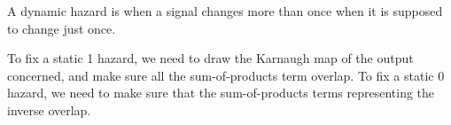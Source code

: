 \documentclass{article}
\begin{document}
\begin{definition}
    A dynamic hazard is when a signal changes more than once when it is supposed to change just once.
\end{definition}

To fix a static 1 hazard, we need to draw the Karnaugh map of the output concerned, and make sure all the sum-of-products term overlap. To fix a static 0 hazard, we need to make sure that the sum-of-products terms representing the inverse overlap.
\end{document}
